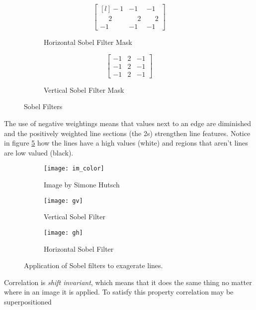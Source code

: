 \begin{figure}[H]
  \begin{subfigure}[b]{0.49\textwidth}
    \[
    \begin{bmatrix*}[l]
     -1 & -1 & -1 \\
      \phantom{-}2 & \phantom{-}2 & \phantom{-}2 \\
      -1 & -1 & -1 
    \end{bmatrix*}
    \]
    \caption{Horizontal Sobel Filter Mask}
    \label{rfidtest_xaxis}
\end{subfigure}
\begin{subfigure}[b]{0.49\textwidth}
  \[ 
    \begin{bmatrix}
      -1 & 2 & -1 \\
      -1 & 2 & -1 \\
      -1 & 2 & -1
    \end{bmatrix}
    \]
    \caption{Vertical Sobel Filter Mask}  
\end{subfigure}
    \caption{Sobel Filters}
    \label{fig:sobel_filters}
\end{figure}

The use of negative weightings means that values next to an edge are diminished and the positively weighted line sections (the 2s) strengthen line features. Notice in figure \ref{fig:sobel_apply} how the lines have a high values (white) and regions that aren't lines are low valued (black).

\begin{figure}[H]
  \centering
  \begin{subfigure}[b]{0.3\textwidth}
      \texttt{[image: im\_color]}
      \caption{Image by Simone Hutsch}
  \end{subfigure}
  \begin{subfigure}[b]{0.3\textwidth}
      \texttt{[image: gv]}
      \caption{Vertical Sobel Filter}
      \label{fig:vert}
  \end{subfigure}
  \begin{subfigure}[b]{0.3\textwidth}
      \texttt{[image: gh]}
      \caption{Horizontal Sobel Filter}
      \label{fig:hoz}
  \end{subfigure}
  \caption{Application of Sobel filters to exagerate lines.}
  \label{fig:sobel_apply}
\end{figure}

Correlation is \emph{shift invariant}, which means that it does the same thing no matter where in an image it is applied. To satisfy this property correlation may be superpositioned 

